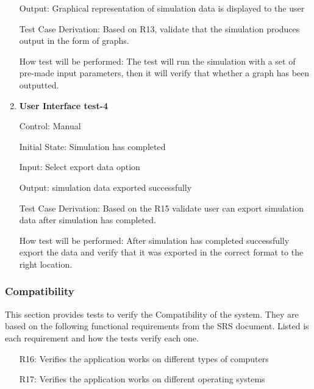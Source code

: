 \documentclass[12pt, titlepage]{article}
\begin{document}
\begin{enumerate}
  Output: Graphical representation of simulation data is displayed to the user
  
  Test Case Derivation: Based on R13, validate that the simulation produces output in the form of graphs.
  
  How test will be performed: The test will run the simulation with a set of pre-made input parameters, then it will verify that whether a graph has been outputted. 
  \item {} \hypertarget{User Interface test-4}{\textbf{User Interface test-4}} \label{User Interface test-4}
  
  Control: Manual
            
  Initial State: Simulation has completed
            
  Input: Select export data option
            
  Output: simulation data exported successfully
  
  Test Case Derivation: Based on the R15 validate user can export simulation data after simulation has completed.
  
  How test will be performed: After simulation has completed successfully export the data and verify that it was exported in the correct format to the right location.

\end{enumerate}

  \subsubsection{Compatibility}

  This section provides tests to verify the Compatibility of the system.
They are based on the following functional requirements from the SRS document.
Listed is each requirement and how the tests verify each one.
\begin{itemize}
  \item [R16:] Verifies the application works on different types of computers
  \item [R17:] Verifies the application works on different operating systems
\end{itemize}
\end{document}
